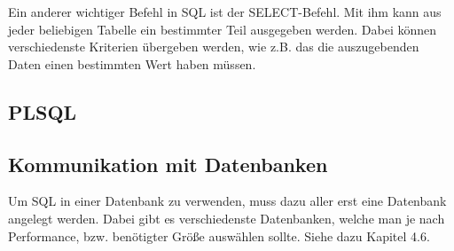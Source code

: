 Ein anderer wichtiger Befehl in SQL ist der SELECT-Befehl. Mit ihm kann aus jeder beliebigen Tabelle ein bestimmter Teil ausgegeben werden. Dabei können verschiedenste Kriterien übergeben werden, wie z.B. das die auszugebenden Daten einen bestimmten Wert haben müssen.

\subsection{PLSQL}

\subsection{Kommunikation mit Datenbanken}
Um SQL in einer Datenbank zu verwenden, muss dazu aller erst eine Datenbank angelegt werden. Dabei gibt es verschiedenste Datenbanken, welche man je nach Performance, bzw. benötigter Größe auswählen sollte. Siehe dazu Kapitel 4.6.


